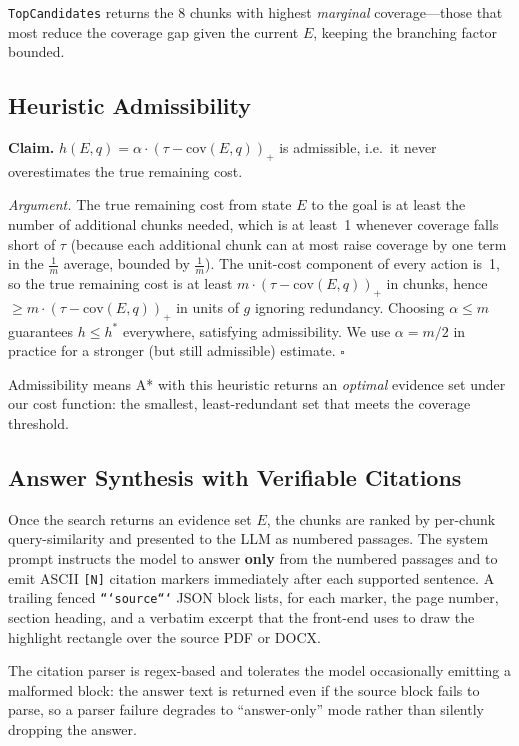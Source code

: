\documentclass[conference]{IEEEtran}
\begin{document}
\texttt{TopCandidates} returns the 8 chunks with highest \textit{marginal}
coverage---those that most reduce the coverage gap given the current $E$,
keeping the branching factor bounded.

\subsection{Heuristic Admissibility}

\textbf{Claim.} $h(E,q) = \alpha \cdot (\tau - \mathrm{cov}(E,q))_{+}$ is
admissible, i.e.\ it never overestimates the true remaining cost.

\textit{Argument.}
The true remaining cost from state $E$ to the goal is at least the number of
additional chunks needed, which is at least~1 whenever coverage falls short of
$\tau$ (because each additional chunk can at most raise coverage by one term in
the $\frac{1}{m}$ average, bounded by $\frac{1}{m}$). The unit-cost component
of every action is~1, so the true remaining cost is at least
$m \cdot (\tau - \mathrm{cov}(E,q))_{+}$ in chunks, hence
$\ge m \cdot (\tau - \mathrm{cov}(E,q))_{+}$ in units of $g$ ignoring
redundancy. Choosing $\alpha \le m$ guarantees $h \le h^{*}$ everywhere,
satisfying admissibility. We use $\alpha = m/2$ in practice for a stronger
(but still admissible) estimate. $\square$

Admissibility means A* with this heuristic returns an \textit{optimal}
evidence set under our cost function: the smallest, least-redundant set that
meets the coverage threshold.

\subsection{Answer Synthesis with Verifiable Citations}

Once the search returns an evidence set $E$, the chunks are ranked by
per-chunk query-similarity and presented to the LLM as numbered passages. The
system prompt instructs the model to answer \textbf{only} from the numbered
passages and to emit ASCII \texttt{[N]} citation markers immediately after each
supported sentence. A trailing fenced \texttt{```source```} JSON block lists,
for each marker, the page number, section heading, and a verbatim excerpt that
the front-end uses to draw the highlight rectangle over the source PDF or DOCX.

The citation parser is regex-based and tolerates the model occasionally
emitting a malformed block: the answer text is returned even if the source
block fails to parse, so a parser failure degrades to ``answer-only'' mode
rather than silently dropping the answer.
\end{document}
